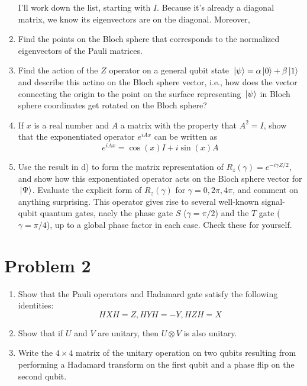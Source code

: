 \documentclass[10pt]{article}
\begin{document}
\begin{enumerate}[label=\alph*)]
			\begin{solution}
				I'll work down the list, starting with \( I \). Because it's already a diagonal matrix, we know its 
				eigenvectors are on the diagonal. Moreover, 
			\end{solution}
		\item Find the points on the Bloch sphere that corresponds to the normalized eigenvectors of the Pauli 
			matrices. 
		\item Find the action of the \( Z \) operator on a general qubit state \( \ket*{\psi} = \alpha\ket*{0} + 
			\beta\ket*{1}\) and describe this actino on the Bloch sphere vector, i.e., how does the vector connecting 
			the origin to the point on the surface representing \( \ket*{\psi} \) in Bloch sphere coordinates
			get rotated on the Bloch sphere?
		\item If \( x \) is a real number and \( A \) a matrix with the property that \( A^2 = I \), show that the 
			exponentiated operator \( e^{iAx} \) can be written as 
			\[
			e^{iAx} = \cos(x)I + i \sin(x) A
			\] 
		\item Use the result in d) to form the matrix representation of \( R_z(\gamma) = e^{-i \gamma Z / 2} \), and 
			show how this exponentiated operator acts on the Bloch sphere vector for \( \ket*{\Psi} \). 
			Evaluate the explicit form of \( R_z(\gamma) \) for \( \gamma = 0, 2\pi, 4\pi \), and comment 
			on anything surprising. This operator gives rise to several well-known signal-qubit quantum gates, 
			naely the phase gate \( S \) (\( \gamma = \pi / 2 \)) and the \( T \) gate (\( \gamma = \pi / 4 \)), up to 
			a global phase factor in each case. Check these for yourself. 
	\end{enumerate}
	\pagebreak
	\section*{Problem 2}
	\begin{enumerate}[label=\alph*)]
		\item Show that the Pauli operators and Hadamard gate satisfy the following identities:
			\[
			HXH = Z, HYH = -Y, HZH = X
			\] 
		\item Show that if \( U \) and \( V \) are unitary, then \( U \otimes V \) is also unitary. 
		\item Write the \( 4 \times 4 \) matrix of the unitary operation on two qubits resulting from 
			performing a Hadamard transform on the first qubit and a phase flip on the second qubit. 
	\end{enumerate}
	\pagebreak
\end{document}
